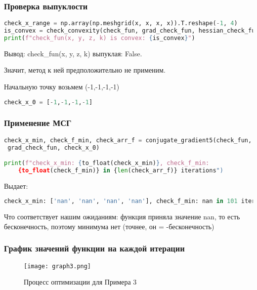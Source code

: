 \documentclass{article}
\begin{document}
\subsubsection{Проверка выпуклости}
\begin{lstlisting}[language=Python]
check_x_range = np.array(np.meshgrid(x, x, x, x)).T.reshape(-1, 4)
is_convex = check_convexity(check_fun, grad_check_fun, hessian_check_fun, check_x_range)
print(f"check_fun(x, y, z, k) is convex: {is_convex}")
\end{lstlisting}

Вывод: check\_fun(x, y, z, k) выпуклая: False.

Значит, метод к ней предположительно не применим.

Начальную точку возьмем (-1,-1,-1,-1)

\begin{lstlisting}[language=Python]
check_x_0 = [-1,-1,-1,-1]
\end{lstlisting}

\newpage
\subsubsection{Применение МСГ}

\begin{lstlisting}[language=Python]
check_x_min, check_f_min, check_arr_f = conjugate_gradient5(check_fun,
 grad_check_fun, check_x_0)

print(f"check_x_min: {to_float(check_x_min)}, check_f_min:
	{to_float(check_f_min)} in {len(check_arr_f)} iterations")
\end{lstlisting}

Выдает:

\begin{lstlisting}[language=Python]
check_x_min: ['nan', 'nan', 'nan', 'nan'], check_f_min: nan in 101 iterations
\end{lstlisting}

Что соответствует нашим ожиданиям: функция приняла значение nan, то есть бесконечность, поэтому минимума нет (точнее, он = -бесконечность)

\subsubsection{График значений функции на каждой итерации}

\begin{figure}[H]
    \centering
    \texttt{[image: graph3.png]}
    \caption{Процесс оптимизации для Примера 3}
\end{figure}
\end{document}
